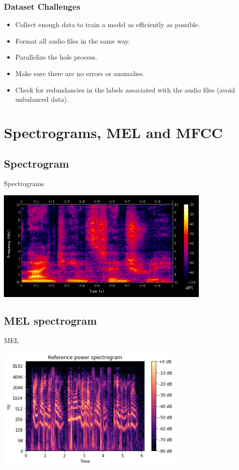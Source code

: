 \documentclass[aspectratio=169, 11pt]{beamer}
\begin{document}
\begin{frame}
  \frametitle{Dataset Challenges}
  \begin{itemize}
    \item Collect enough data to train a model as efficiently as possible.
    \item Format all audio files in the same way.
    \item Parallelize the hole process.
    \item Make sure there are no errors or anomalies.
    \item Check for redundancies in the labels associated with the audio files (avoid unbalanced data).
  \end{itemize}
\end{frame}

\section{Spectrograms, MEL and MFCC}

\subsection{Spectrogram}

\begin{frame}{Spectrograms}
  \begin{center}
    \includegraphics[width=0.8\textwidth]{image/Spectrogram.png}
  \end{center}
\end{frame}

\subsection{MEL spectrogram}

\begin{frame}{MEL}
  \begin{center}
    \includegraphics[width=0.7\textwidth]{image/Mel_spectro.png}
  \end{center}
\end{frame}
\end{document}
